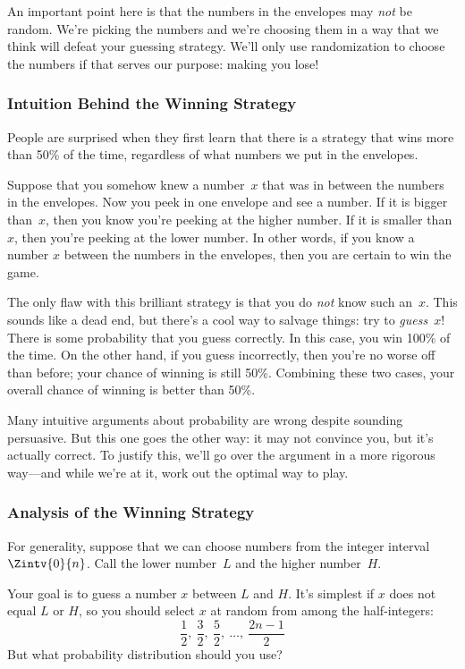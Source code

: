 An important point here is that the numbers in the envelopes may
\emph{not} be random.  We're picking the numbers and we're choosing
them in a way that we think will defeat your guessing strategy.  We'll
only use randomization to choose the numbers if that serves our
purpose: making you lose!

\subsubsection{Intuition Behind the Winning Strategy}

People are surprised when they first learn that there is a strategy
that wins more than 50\% of the time, regardless of what numbers we
put in the envelopes.

Suppose that you somehow knew a number~$x$ that was in between the
numbers in the envelopes.  Now you peek in one envelope and see a
number.  If it is bigger than~$x$, then you know you're peeking at the
higher number.  If it is smaller than $x$, then you're peeking at the
lower number.  In other words, if you know a number $x$ between the
numbers in the envelopes, then you are certain to win the game.

The only flaw with this brilliant strategy is that you do \emph{not}
know such an~$x$.  This sounds like a dead end, but there's a cool way
to salvage things: try to \emph{guess}~$x$!  There is some probability
that you guess correctly.  In this case, you win 100\% of the time.
On the other hand, if you guess incorrectly, then you're no worse off
than before; your chance of winning is still 50\%.  Combining these
two cases, your overall chance of winning is better than 50\%.

Many intuitive arguments about probability are wrong despite sounding
persuasive.  But this one goes the other way: it may not convince you,
but it's actually correct.  To justify this, we'll go over the
argument in a more rigorous way---and while we're at it, work out the
optimal way to play.


\subsubsection{Analysis of the Winning Strategy}

For generality, suppose that we can choose numbers from the integer
interval $\Zintv{0}{n}$.  Call the lower number~$L$ and the higher
number~$H$.

Your goal is to guess a number $x$ between $L$ and $H$.  It's simplest
if $x$ does not equal $L$ or $H$, so you should select $x$ at random
from among the half-integers:
%
\[
\frac{1}{2},\ \frac{3}{2},\ \frac{5}{2},\ \dots,\ \frac{2n-1}{2}
\]
%
But what probability distribution should you use?

